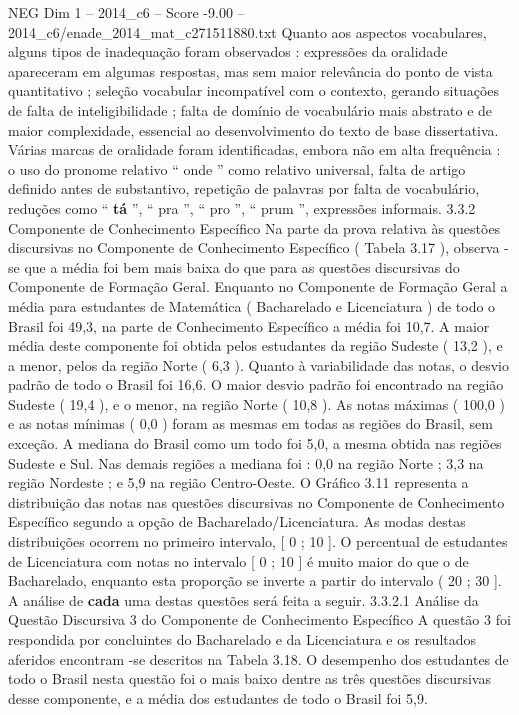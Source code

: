 \begin{textsample}{NEG Dim 1 – 2014\_c6 – Score -9.00 – 2014\_c6/enade\_2014\_mat\_c271511880.txt}
Quanto aos aspectos vocabulares, alguns tipos de inadequação foram observados : expressões da oralidade apareceram em algumas respostas, mas sem maior relevância do ponto de vista quantitativo ; seleção vocabular incompatível com o contexto, gerando situações de falta de inteligibilidade ; falta de domínio de vocabulário mais abstrato e de maior complexidade, essencial ao desenvolvimento do texto de base dissertativa.
Várias marcas de oralidade foram identificadas, embora não em alta frequência : o uso do pronome relativo “ onde ” como relativo universal, falta de artigo definido antes de substantivo, repetição de palavras por falta de vocabulário, reduções como “ \textbf{tá} ”, “ pra ”, “ pro ”, “ prum ”, expressões informais. 3.3.2 Componente de Conhecimento Específico Na parte da prova relativa às questões discursivas no Componente de Conhecimento Específico ( Tabela 3.17 ), observa -se que a média foi bem mais baixa do que para as questões discursivas do Componente de Formação Geral.
Enquanto no Componente de Formação Geral a média para estudantes de Matemática ( Bacharelado e Licenciatura ) de todo o Brasil foi 49,3, na parte de Conhecimento Específico a média foi 10,7.
A maior média deste componente foi obtida pelos estudantes da região Sudeste ( 13,2 ), e a menor, pelos da região Norte ( 6,3 ).
Quanto à variabilidade das notas, o desvio padrão de todo o Brasil foi 16,6.
O maior desvio padrão foi encontrado na região Sudeste ( 19,4 ), e o menor, na região Norte ( 10,8 ).
As notas máximas ( 100,0 ) e as notas mínimas ( 0,0 ) foram as mesmas em todas as regiões do Brasil, sem exceção.
A mediana do Brasil como um todo foi 5,0, a mesma obtida nas regiões Sudeste e Sul.
Nas demais regiões a mediana foi : 0,0 na região Norte ; 3,3 na região Nordeste ; e 5,9 na região Centro-Oeste.
O Gráfico 3.11 representa a distribuição das notas nas questões discursivas no Componente de Conhecimento Específico segundo a opção de Bacharelado/Licenciatura.
As modas destas distribuições ocorrem no primeiro intervalo, [ 0 ; 10 ].
O percentual de estudantes de Licenciatura com notas no intervalo [ 0 ; 10 ] é muito maior do que o de Bacharelado, enquanto esta proporção se inverte a partir do intervalo ( 20 ; 30 ].
A análise de \textbf{cada} uma destas questões será feita a seguir. 3.3.2.1 Análise da Questão Discursiva 3 do Componente de Conhecimento Específico A questão 3 foi respondida por concluintes do Bacharelado e da Licenciatura e os resultados aferidos encontram -se descritos na Tabela 3.18.
O desempenho dos estudantes de todo o Brasil nesta questão foi o mais baixo dentre as três questões discursivas desse componente, e a média dos estudantes de todo o Brasil foi 5,9.

\end{textsample}
